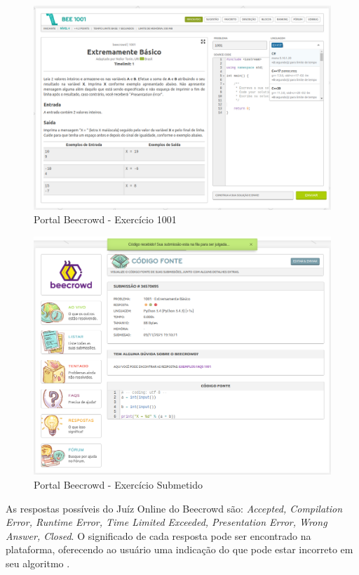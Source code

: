 \begin{figure}[h!]
	   \centering
            \caption{Portal Beecrowd - Exercício 1001}
            \label{fig:ModeloConceitual}
	   	\includegraphics[scale=0.3]{pictures/beecrowd_1001.png}
\end{figure}

\begin{figure}[h!]
	   \centering
            \caption{Portal Beecrowd - Exercício Submetido}
            \label{fig:ModeloConceitual}
	   	\includegraphics[scale=0.3]{pictures/beecrowd_submetido.png}
\end{figure}

As respostas possíveis do Juíz Online do Beecrowd são: \textit{Accepted, Compilation Error, Runtime Error, Time Limited Exceeded, Presentation Error, Wrong Answer, Closed}. O significado de cada resposta pode ser encontrado na plataforma, oferecendo ao usuário uma indicação do que pode estar incorreto em seu algoritmo \cite{beecrowd}.

